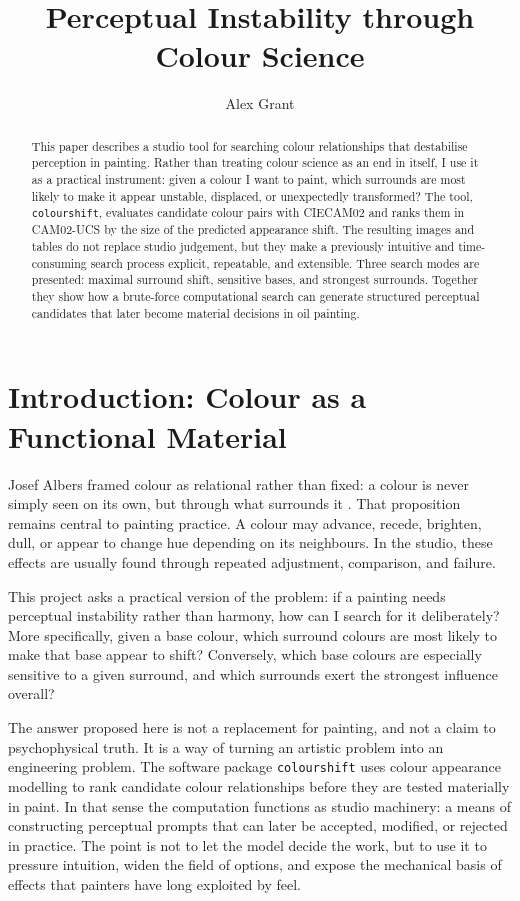 \documentclass[11pt]{article}
\title{Perceptual Instability through Colour Science}
\author{Alex Grant}
\date{}
\begin{document}
\maketitle

\begin{abstract}
This paper describes a studio tool for searching colour relationships that destabilise perception in painting. Rather than treating colour science as an end in itself, I use it as a practical instrument: given a colour I want to paint, which surrounds are most likely to make it appear unstable, displaced, or unexpectedly transformed? The tool, \texttt{colourshift}, evaluates candidate colour pairs with CIECAM02 and ranks them in CAM02-UCS by the size of the predicted appearance shift. The resulting images and tables do not replace studio judgement, but they make a previously intuitive and time-consuming search process explicit, repeatable, and extensible. Three search modes are presented: maximal surround shift, sensitive bases, and strongest surrounds. Together they show how a brute-force computational search can generate structured perceptual candidates that later become material decisions in oil painting.
\end{abstract}

\section{Introduction: Colour as a Functional Material}
Josef Albers framed colour as relational rather than fixed: a colour is never simply seen on its own, but through what surrounds it \parencite{albers1963interaction}. That proposition remains central to painting practice. A colour may advance, recede, brighten, dull, or appear to change hue depending on its neighbours. In the studio, these effects are usually found through repeated adjustment, comparison, and failure.

This project asks a practical version of the problem: if a painting needs perceptual instability rather than harmony, how can I search for it deliberately? More specifically, given a base colour, which surround colours are most likely to make that base appear to shift? Conversely, which base colours are especially sensitive to a given surround, and which surrounds exert the strongest influence overall?

The answer proposed here is not a replacement for painting, and not a claim to psychophysical truth. It is a way of turning an artistic problem into an engineering problem. The software package \texttt{colourshift} \parencite{colourshift} uses colour appearance modelling to rank candidate colour relationships before they are tested materially in paint. In that sense the computation functions as studio machinery: a means of constructing perceptual prompts that can later be accepted, modified, or rejected in practice. The point is not to let the model decide the work, but to use it to pressure intuition, widen the field of options, and expose the mechanical basis of effects that painters have long exploited by feel.
\end{document}

